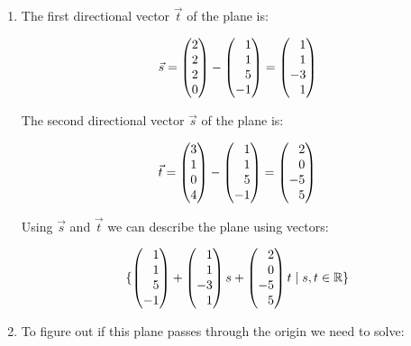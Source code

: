 \documentclass[12pt]{article}
\newenvironment{abc}{\begin{enumerate}[label={\bf(\alph*)}]}{\end{enumerate}}
\newcommand\m[2][]{
	\ifthenelse{\equal {#1} {}}
		{\begin{pmatrix*}[r]#2\end{pmatrix*}}
		{\left(\begin{array}{#1}#2\end{array}\right)}
}
\begin{document}
\begin{abc}
\item{
	The first directional vector $\vec{t}$ of the plane is:

	\begin{equation}
		\vec{s} = \m{2 \\ 2 \\ 2 \\ 0} - \m{1 \\ 1 \\ 5 \\ -1} = \m{1 \\ 1 \\ -3 \\ 1}
	\end{equation}

	The second directional vector $\vec{s}$ of the plane is:

	\begin{equation}
		\vec{t} = \m{3 \\ 1 \\ 0 \\ 4} - \m{1 \\ 1 \\ 5 \\ -1} = \m{2 \\ 0 \\ -5 \\ 5}
	\end{equation}

	Using $\vec{s}$ and $\vec{t}$ we can describe the plane using vectors:

	\begin{equation}
		\{ \m{1 \\ 1 \\ 5 \\ -1} + \m{1 \\ 1 \\ -3 \\ 1} s + \m{2 \\ 0 \\ -5 \\ 5} t \mid s, t \in \mathbb{R} \}
	\end{equation}
}

\item{
	To figure out if this plane passes through the origin we need to solve:

}
\end{abc}
\end{document}
